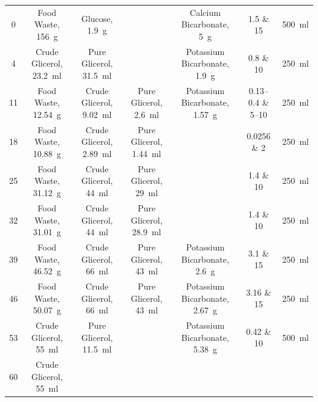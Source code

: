 \begin{ThreePartTable}
\begin{xltabular}{\linewidth}{@{} C C C C C C C @{}}
    \num{0} &
    Food Waste, \qty{156}{\gram} &
    Glucose, \qty{1.9}{\gram} &
    &
    Calcium Bicarbonate, \qty{5}{\gram} &
    \num{1.5} \& \num{15} &
    \qty{500}{\milli\litre} \\
    \addlinespace
    \num{4} &
    Crude Glicerol, \qty{23.2}{\milli\litre} &
    Pure Glicerol, \qty{31.5}{\milli\litre} &
    &
    Potassium Bicarbonate, \qty{1.9}{\gram} &
    \num{0.8} \& \num{10} &
    \qty{250}{\milli\litre} \\
    \addlinespace
    \num{11} &
    Food Waste, \qty{12.54}{\gram} &
    Crude Glicerol, \qty{9.02}{\milli\litre} &
    Pure Glicerol, \qty{2.6}{\milli\litre} &
    Potassium Bicarbonate, \qty{1.57}{\gram} &
    \numrange{0.13}{0.4} \& \numrange{5}{10} &
    \qty{250}{\milli\litre} \\
    \addlinespace
    \num{18} &
    Food Waste, \qty{10.88}{\gram} &
    Crude Glicerol, \qty{2.89}{\milli\litre} &
    Pure Glicerol, \qty{1.44}{\milli\litre} &
    &
    \num{0.0256} \& \num{2} &
    \qty{250}{\milli\litre} \\
    \addlinespace
    \num{25} &
    Food Waste, \qty{31.12}{\gram} &
    Crude Glicerol, \qty{44}{\milli\litre} &
    Pure Glicerol, \qty{29}{\milli\litre} &
    &
    \num{1.4} \& \num{10} &
    \qty{250}{\milli\litre} \\
    \addlinespace
    \num{32} &
    Food Waste, \qty{31.01}{\gram} &
    Crude Glicerol, \qty{44}{\milli\litre} &
    Pure Glicerol, \qty{28.9}{\milli\litre} &
    &
    \num{1.4} \& \num{10} &
    \qty{250}{\milli\litre} \\
    \addlinespace
    \num{39} &
    Food Waste, \qty{46.52}{\gram} &
    Crude Glicerol, \qty{66}{\milli\litre} &
    Pure Glicerol, \qty{43}{\milli\litre} &
    Potassium Bicarbonate, \qty{2.6}{\gram} &
    \num{3.1} \& \num{15} &
    \qty{250}{\milli\litre} \\
    \addlinespace
    \num{46} &
    Food Waste, \qty{50.07}{\gram} &
    Crude Glicerol, \qty{66}{\milli\litre} &
    Pure Glicerol, \qty{43}{\milli\litre} &
    Potassium Bicarbonate, \qty{2.67}{\gram} &
    \num{3.16} \& \num{15} &
    \qty{250}{\milli\litre} \\
    \addlinespace
    \num{53} &
    Crude Glicerol, \qty{55}{\milli\litre} &
    Pure Glicerol, \qty{11.5}{\milli\litre} &
    &
    Potassium Bicarbonate, \qty{5.38}{\gram} &
    \num{0.42} \& \num{10} &
    \qty{500}{\milli\litre} \\
    \addlinespace
    \num{60} &
    Crude Glicerol, \qty{55}{\milli\litre} &

\end{xltabular}
\end{ThreePartTable}
